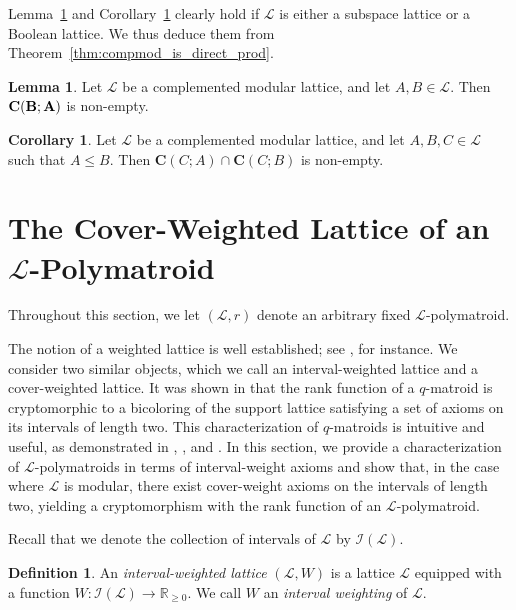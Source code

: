 \documentclass[a4paper,11pt,reqno]{article}
\theoremstyle{definition}
\newtheorem{definition}[theorem]{{{Definition}}}
\newtheorem{corollary}[theorem]{{{Corollary}}}
\newtheorem{lemma}[theorem]{{{Lemma}}}
\newcommand{\mL}{\mathcal{L}}
\newcommand{\I}{\mathcal{I}}
\newcommand{\cC}{\textup{\bf{C}}}
\begin{document}
Lemma~\ref{lem:compl_partition} and Corollary~\ref{cor:decomp_both} clearly hold if $\mathcal{L}$ is either a subspace lattice or a Boolean lattice. We thus deduce them from Theorem~\ref{thm:compmod_is_direct_prod}.

\begin{lemma}\label{lem:compl_partition}
    Let $\mL$ be a complemented modular lattice, and 
    let $A,B\in\mL$. Then $\cC(B;A)$ is non-empty.
\end{lemma}

\begin{corollary}\label{cor:decomp_both}
    Let $\mL$ be a complemented modular lattice, and let $A,B,C\in\mathcal{L}$ such that $A\leq B$. Then $\mathbf{C}(C;A)\cap \mathbf{C}(C;B)$ is non-empty.
\end{corollary}


\section{The Cover-Weighted Lattice of an \texorpdfstring{$\mathcal{L}$}{L}-Polymatroid}\label{sec:covlatt}

Throughout this section, we let $(\mathcal{L},r)$ denote an arbitrary fixed $\mL$-polymatroid.

The notion of a weighted lattice is well established; see \cite{whittle}, for instance. We consider two similar objects, which we call an interval-weighted lattice and a cover-weighted lattice.
It was shown in \cite{BCJ17} that the rank function of a $q$-matroid is cryptomorphic to a bicoloring of the support lattice satisfying a set of axioms on its intervals of length two. This characterization of $q$-matroids is intuitive and useful, as demonstrated in \cite{BCJ17}, \cite{BF22}, and \cite{CJ22}. In this section, we 
provide a characterization of $\mL$-polymatroids in terms of interval-weight axioms and show that, in the case where $\mL$ is modular, there exist cover-weight axioms on the intervals of length two, yielding a cryptomorphism with the rank function of an $\mL$-polymatroid.

Recall that we denote the collection of intervals of $\mL$ by $\I(\mL)$. 

\begin{definition}
    An \emph{interval-weighted lattice} $(\mathcal{L},W)$ is a lattice $\mathcal{L}$ equipped with a function $W:\mathcal{I}(\mathcal{L})\rightarrow\mathbb{R}_{\geq0}$. We call $W$ an \emph{interval weighting} of $\mathcal{L}$.
\end{definition}
\end{document}
